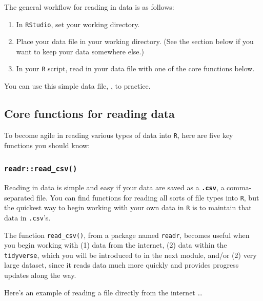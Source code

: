 \documentclass[
]{book}
\providecommand{\tightlist}{%
  \setlength{\itemsep}{0pt}\setlength{\parskip}{0pt}}
\begin{document}
The general workflow for reading in data is as follows:

\begin{enumerate}
\def\labelenumi{\arabic{enumi}.}
\tightlist
\item
  In \texttt{RStudio}, set your working directory.
\item
  Place your data file in your working directory. (See the section below if you want to keep your data somewhere else.)
\item
  In your \texttt{R} script, read in your data file with one of the core functions below.
\end{enumerate}

You can use this simple data file, , to practice.

\hypertarget{core-functions-for-reading-data}{%
\subsection*{Core functions for reading data}\label{core-functions-for-reading-data}}

To become agile in reading various types of data into \texttt{R}, here are five key functions you should know:

\hypertarget{readrread_csv}{%
\subsubsection*{\texorpdfstring{\texttt{readr::read\_csv()}}{readr::read\_csv()}}\label{readrread_csv}}

Reading in data is simple and easy if your data are saved as a \textbf{\texttt{.csv}}, a comma-separated file. You can find functions for reading all sorts of file types into \texttt{R}, but the quickest way to begin working with your own data in \texttt{R} is to maintain that data in \texttt{.csv}'s.

The function \texttt{read\_csv()}, from a package named \texttt{readr}, becomes useful when you begin working with (1) data from the internet, (2) data within the \texttt{tidyverse}, which you will be introduced to in the next module, and/or (2) very large dataset, since it reads data much more quickly and provides progress updates along the way.

Here's an example of reading a file directly from the internet \ldots{}
\end{document}
